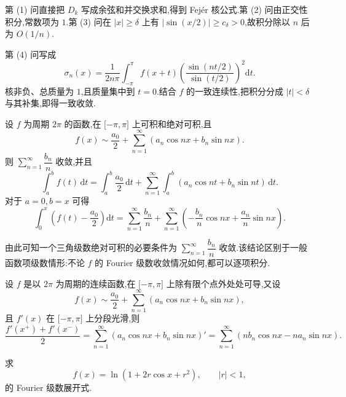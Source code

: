 \begin{solution}
    第 (1) 问直接把 $D_k$ 写成余弦和并交换求和,得到 Fejér 核公式.第 (2) 问由正交性积分,常数项为 $1$.第 (3) 问在 $|x|\geq\delta$ 上有
    $|\sin(x/2)|\geq c_\delta>0$,故积分除以 $n$ 后为 $O(1/n)$.

    第 (4) 问写成
    \[
        \sigma_n(x)=\dfrac{1}{2n\pi}\int_{-\pi}^{\pi}f(x+t)
        \left(\dfrac{\sin(nt/2)}{\sin(t/2)}\right)^2\mathrm{d}t.
    \]
    核非负、总质量为 $1$,且质量集中到 $t=0$.结合 $f$ 的一致连续性,把积分分成 $|t|<\delta$ 与其补集,即得一致收敛.
\end{solution}

\begin{theorem}
    设 $f$ 为周期 $2\pi$ 的函数,在 $\lbrack -\pi,\pi\rbrack$ 上可积和绝对可积,且
    \[
        f(x)\sim\dfrac{a_0}{2}+\sum\limits_{n=1}^{\infty}(a_n\cos nx+b_n\sin nx).
    \]
    则 $\displaystyle\sum\limits_{n=1}^{\infty}\dfrac{b_n}{n}$ 收敛,并且
    \[
        \int_a^bf(t)\,\mathrm{d}t
        =\int_a^b\dfrac{a_0}{2}\,\mathrm{d}t
        +\sum\limits_{n=1}^{\infty}\int_a^b(a_n\cos nt+b_n\sin nt)\,\mathrm{d}t.
    \]
    对于 $a=0,b=x$ 可得
    \[
        \int_0^x\left(f(t)-\dfrac{a_0}{2}\right)\mathrm{d}t
        =\sum\limits_{n=1}^{\infty}\dfrac{b_n}{n}
        +\sum\limits_{n=1}^{\infty}\left(-\dfrac{b_n}{n}\cos nx+\dfrac{a_n}{n}\sin nx\right).
    \]
\end{theorem}

\begin{remark}
    由此可知一个三角级数绝对可积的必要条件为 $\displaystyle\sum\limits_{n=1}^{\infty}\dfrac{b_n}{n}$ 收敛.该结论区别于一般函数项级数情形:不论 $f$ 的 Fourier 级数收敛情况如何,都可以逐项积分.
\end{remark}

\begin{theorem}
    设 $f$ 是以 $2\pi$ 为周期的连续函数,在 $\lbrack -\pi,\pi\rbrack$ 上除有限个点外处处可导,又设
    \[
        f(x)\sim\dfrac{a_0}{2}+\sum\limits_{n=1}^{\infty}(a_n\cos nx+b_n\sin nx),
    \]
    且 $f'(x)$ 在 $\lbrack -\pi,\pi\rbrack$ 上分段光滑,则
    \[
        \dfrac{f'(x^+)+f'(x^-)}{2}
        =\sum\limits_{n=1}^{\infty}(a_n\cos nx+b_n\sin nx)'
        =\sum\limits_{n=1}^{\infty}(nb_n\cos nx-na_n\sin nx).
    \]
\end{theorem}

\begin{example}
    求
    \[
        f(x)=\ln(1+2r\cos x+r^2),
        \qquad |r|<1,
    \]
    的 Fourier 级数展开式.
\end{example}
\exampleblank

